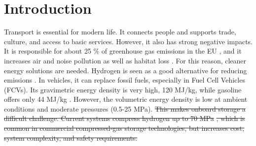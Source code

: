 \documentclass[review]{elsarticle}
\begin{document}
\begin{frontmatter}
\begin{abstract}
{properties near those identified regions were performed.} \textcolor{red}{A 
pronounced feasibility gap is observed: while a subset of \sout{frameworks} 
\textcolor{blue}{the selected MOFs} approaches the gravimetric target (5.5~wt. 
\%), reaching values up to 11~wt. \%, none in the present dataset meet the 
volumetric requirement (0.040~kg/L) at 25~MPa, with most \sout{candidates} 
\textcolor{blue}{MOFs} falling below 0.024~kg/L. This negative result 
highlights intrinsic trade-offs between porosity and volumetric packing in 
adsorption-based storage at moderate pressure. The resulting descriptor-space 
maps delineate practical boundaries for subsequent simulation or experimental 
screening within the explored feature space.}
\end{abstract}

\end{frontmatter}



\section{Introduction}

Transport is essential for modern life. It connects people and supports trade, culture, and access to basic services. However, it also has strong negative impacts. It is responsible for about 25 \% of greenhouse gas emissions in the EU \cite{zjb+24,cde+22,jena11}, and it increases air and noise pollution as well as habitat loss \cite{tm24,netzeroiea,netzerousa,smcf20,doe25}. For this reason, cleaner energy solutions are needed. 
Hydrogen is seen as a good alternative for reducing emissions \cite{netzeroiea,zjb+24,cstc22,apap19,bw15,bhlk+26,laaz+25}. In vehicles, it can replace fossil fuels, especially in Fuel Cell Vehicles (FCVs). Its gravimetric energy density is very high, 120 MJ/kg, while gasoline offers only 44 MJ/kg \cite{doe25}. However, the volumetric energy density is low at ambient conditions and moderate pressures (0.5-25 MPa). \sout{This makes onboard storage a difficult challenge. Current systems compress hydrogen up to 70 MPa} \cite{atd20,hv14,cwlcz23,rhs+22,breeze18,dy11}\sout{, which is common in commercial compressed-gas storage technologies, but increases cost, system complexity, and safety requirements.}
\end{document}
